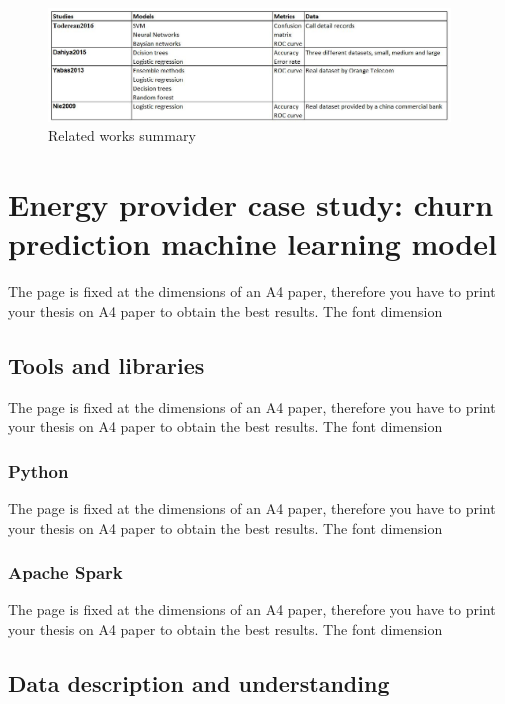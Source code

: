 \documentclass[LaM,binding=0.6cm, english]{sapthesis}
\begin{document}
\begin{figure}[h!]
    \includegraphics[width=0.95\textwidth]{images/studies_summary.jpg}
    \centering
    \caption{Related works summary}
    \label{fig:studies-summary}
\end{figure}

\chapter{Energy provider case study: churn prediction machine learning model}

The page is fixed at the dimensions of an A4 paper, therefore you have to print your thesis on A4 paper to obtain the best results. The font dimension

\section{Tools and libraries}

The page is fixed at the dimensions of an A4 paper, therefore you have to print your thesis on A4 paper to obtain the best results. The font dimension


\subsection{Python}

The page is fixed at the dimensions of an A4 paper, therefore you have to print your thesis on A4 paper to obtain the best results. The font dimension


\subsection{Apache Spark}

The page is fixed at the dimensions of an A4 paper, therefore you have to print your thesis on A4 paper to obtain the best results. The font dimension

\section{Data description and understanding}
\end{document}
